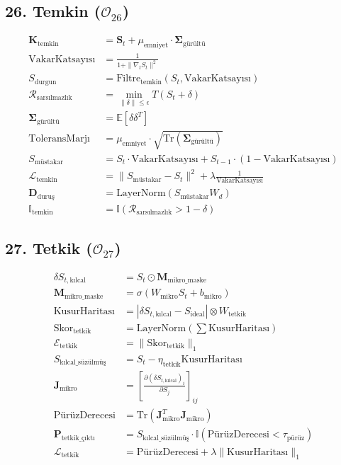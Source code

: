 \documentclass[11pt, a4paper]{article}
\begin{document}
\subsection{26. Temkin ($\mathcal{O}_{26}$)}
\begin{align}
\mathbf{K}_{\text{temkin}} &= \mathbf{S}_t + \mu_{\text{emniyet}} \cdot \mathbf{\Sigma}_{\text{gürültü}} \\
\text{VakarKatsayısı} &= \frac{1}{1 + \|\nabla_t S_t\|^2} \\
S_{\text{durgun}} &= \text{Filtre}_{\text{temkin}}(S_t, \text{VakarKatsayısı}) \\
\mathcal{R}_{\text{sarsılmazlık}} &= \min_{\|\delta\| \le \epsilon} T(S_t + \delta) \\
\mathbf{\Sigma}_{\text{gürültü}} &= \mathbb{E}[\delta \delta^T] \\
\text{ToleransMarjı} &= \mu_{\text{emniyet}} \cdot \sqrt{\text{Tr}(\mathbf{\Sigma}_{\text{gürültü}})} \\
S_{\text{müstakar}} &= S_t \cdot \text{VakarKatsayısı} + S_{t-1} \cdot (1 - \text{VakarKatsayısı}) \\
\mathcal{L}_{\text{temkin}} &= \| S_{\text{müstakar}} - S_t \|^2 + \lambda \frac{1}{\text{VakarKatsayısı}} \\
\mathbf{D}_{\text{duruş}} &= \text{LayerNorm}(S_{\text{müstakar}} W_d) \\
\mathbb{I}_{\text{temkin}} &= \mathbb{I}(\mathcal{R}_{\text{sarsılmazlık}} > 1 - \delta)
\end{align}

\subsection{27. Tetkik ($\mathcal{O}_{27}$)}
\begin{align}
\delta S_{t, \text{kılcal}} &= S_t \odot \mathbf{M}_{\text{mikro\_maske}} \\
\mathbf{M}_{\text{mikro\_maske}} &= \sigma(W_{\text{mikro}} S_t + b_{\text{mikro}}) \\
\text{KusurHaritası} &= |\delta S_{t, \text{kılcal}} - S_{\text{ideal}}| \otimes W_{\text{tetkik}} \\
\text{Skor}_{\text{tetkik}} &= \text{LayerNorm}\left(\sum \text{KusurHaritası}\right) \\
\mathcal{E}_{\text{tetkik}} &= \| \text{Skor}_{\text{tetkik}} \|_1 \\
S_{\text{kılcal\_süzülmüş}} &= S_t - \eta_{\text{tetkik}} \text{KusurHaritası} \\
\mathbf{J}_{\text{mikro}} &= \left[ \frac{\partial (\delta S_{t, \text{kılcal}})_i}{\partial S_j} \right]_{ij} \\
\text{PürüzDerecesi} &= \text{Tr}(\mathbf{J}_{\text{mikro}}^T \mathbf{J}_{\text{mikro}}) \\
\mathbf{P}_{\text{tetkik\_çıktı}} &= S_{\text{kılcal\_süzülmüş}} \cdot \mathbb{I}(\text{PürüzDerecesi} < \tau_{\text{pürüz}}) \\
\mathcal{L}_{\text{tetkik}} &= \text{PürüzDerecesi} + \lambda \| \text{KusurHaritası} \|_1
\end{align}
\end{document}

